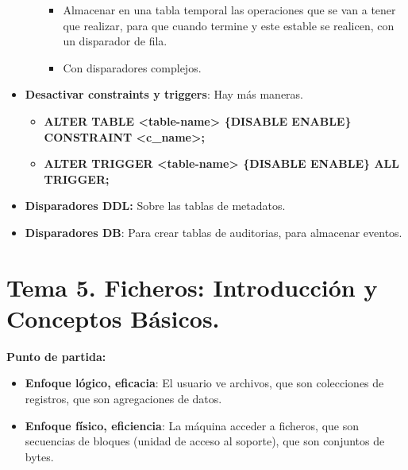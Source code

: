 \documentclass[12pt, twoside, openright]{report} %
\begin{document}
\begin{itemize}
\begin{itemize}
      \begin{itemize}
      \item Almacenar en una tabla temporal las operaciones que se van a
        tener que realizar, para que cuando termine y este estable se
        realicen, con un disparador de fila.
        
      \item Con disparadores complejos.
        
      \end{itemize}
    \end{itemize}
  \item \textbf{Desactivar constraints y triggers}: Hay más maneras.
    

    \begin{itemize}
    \item \textbf{ALTER TABLE \textless table-name\textgreater{} \{DISABLE
      \textbar{} ENABLE\} CONSTRAINT \textless c\_name\textgreater;}
      
    \item \textbf{ALTER TRIGGER \textless table-name\textgreater{} \{DISABLE
      \textbar{} ENABLE\} ALL TRIGGER;}
      
    \end{itemize}
  \item \textbf{Disparadores DDL:} Sobre las tablas de metadatos.
    
  \item \textbf{Disparadores DB}: Para crear tablas de auditorias, para
    almacenar eventos.
    
  \end{itemize}

  
\chapter{Tema 5. Ficheros: Introducción y Conceptos Básicos.}



  
  \textbf{Punto de partida:}
  

  \begin{itemize}
  \item \textbf{Enfoque lógico, eficacia}: El usuario ve archivos, que son
    colecciones de registros, que son agregaciones de datos.
    
  \item \textbf{Enfoque físico, eficiencia}: La máquina acceder a ficheros,
    que son secuencias de bloques (unidad de acceso al soporte), que son
    conjuntos de bytes.
    
  \end{itemize}
\end{document}
